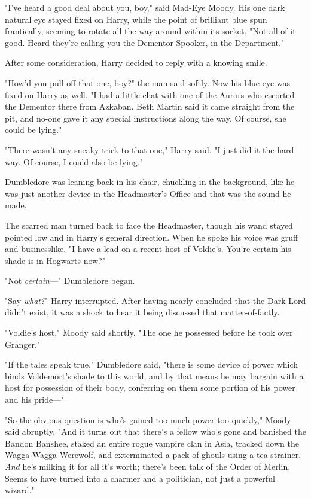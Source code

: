 "I've heard a good deal about you, boy," said Mad-Eye Moody. His one dark
natural eye stayed fixed on Harry, while the point of brilliant blue spun
frantically, seeming to rotate all the way around within its socket. "Not all
of it good. Heard they're calling you the Dementor Spooker, in the Department."

After some consideration, Harry decided to reply with a knowing smile.

"How'd you pull off that one, boy?" the man said softly. Now his blue eye was
fixed on Harry as well. "I had a little chat with one of the Aurors who
escorted the Dementor there from Azkaban. Beth Martin said it came straight
from the pit, and no-one gave it any special instructions along the way. Of
course, she could be lying."

"There wasn't any sneaky trick to that one," Harry said. "I just did it the
hard way. Of course, I could also be lying."

Dumbledore was leaning back in his chair, chuckling in the background, like he
was just another device in the Headmaster's Office and that was the sound he
made.

The scarred man turned back to face the Headmaster, though his wand stayed
pointed low and in Harry's general direction. When he spoke his voice was gruff
and businesslike. "I have a lead on a recent host of Voldie's. You're certain
his shade is in Hogwarts now?"

"Not \emph{certain}---" Dumbledore began.

"Say \emph{what?}" Harry interrupted. After having nearly concluded that the
Dark Lord didn't exist, it was a shock to hear it being discussed that
matter-of-factly.

"Voldie's host," Moody said shortly. "The one he possessed before he took over
Granger."

"If the tales speak true," Dumbledore said, "there is some device of power
which binds Voldemort's shade to this world; and by that means he may bargain
with a host for possession of their body, conferring on them some portion of
his power and his pride---"

"So the obvious question is who's gained too much power too quickly," Moody
said abruptly. "And it turns out that there's a fellow who's gone and banished
the Bandon Banshee, staked an entire rogue vampire clan in Asia, tracked down
the Wagga-Wagga Werewolf, and exterminated a pack of ghouls using a
tea-strainer. \emph{And} he's milking it for all it's worth; there's been talk
of the Order of Merlin. Seems to have turned into a charmer and a politician,
not just a powerful wizard."

